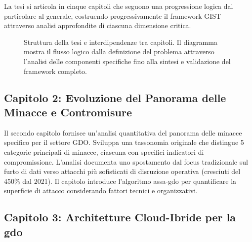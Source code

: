 La tesi si articola in cinque capitoli che seguono una progressione logica dal particolare al generale, costruendo progressivamente il framework GIST attraverso analisi approfondite di ciascuna dimensione critica.

\begin{figure}[H]
\centering
{}
\caption{Struttura della tesi e interdipendenze tra capitoli. Il diagramma mostra il flusso logico dalla definizione del problema attraverso l'analisi delle componenti specifiche fino alla sintesi e validazione del framework completo.}
\label{fig:thesis_structure}
\end{figure}

\subsection{\texorpdfstring{\textbf{Capitolo 2: Evoluzione del Panorama delle Minacce e Contromisure}}{1.6.1 - Capitolo 2: Evoluzione del Panorama delle Minacce e Contromisure}}
\label{subsec:struttura_cap2}

Il secondo capitolo fornisce un'analisi quantitativa del panorama delle minacce specifico per il settore GDO. Sviluppa una tassonomia originale che distingue 5 categorie principali di minacce, ciascuna con specifici indicatori di compromissione. L'analisi documenta uno spostamento dal focus tradizionale sul furto di dati verso attacchi più sofisticati di disruzione operativa (cresciuti del 450\% dal 2021). Il capitolo introduce l'algoritmo \gls{assa-gdo} per quantificare la superficie di attacco considerando fattori tecnici e organizzativi.

\subsection{\texorpdfstring{\textbf{Capitolo 3: Architetture Cloud-Ibride per la \gls{gdo}}}{1.6.2 - Capitolo 3: Architetture Cloud-Ibride per la GDO}}
\label{subsec:struttura_cap3}

